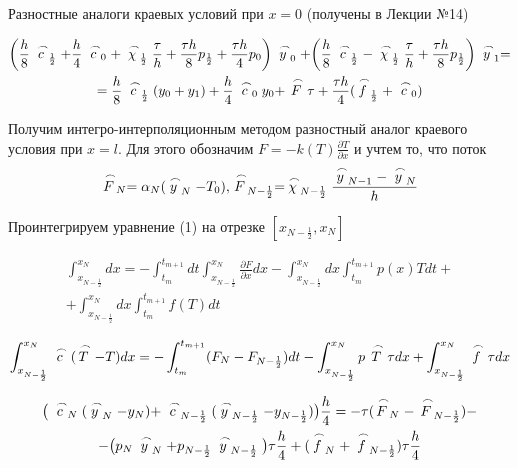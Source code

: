 \documentclass[a4paper, 14pt]{article}
\begin{document}
Разностные аналоги краевых условий при $x = 0$ (получены в Лекции №14)

\begin{multline}
\bigg(\frac{h}{8}\buildrel\,\,\frown\over{c}_{\frac{1}{2}}+ \frac{h}{4}\buildrel\,\,\frown\over{c}_0+\buildrel\,\,\frown\over{\chi}_{\frac{1}{2}}\frac{\tau}{h}+\frac{\tau h}{8}p_{\frac{1}{2}}+\frac{\tau h}{4}p_0\bigg)\buildrel\,\,\frown\over{y}_0+\bigg(\frac{h}{8}\buildrel\,\,\frown\over{c}_{\frac{1}{2}}-\buildrel\,\,\frown\over{\chi}_{\frac{1}{2}}\frac{\tau}{h}+\frac{\tau h}{8}p_{\frac{1}{2}}\bigg)\buildrel\,\,\frown\over{y}_1=\\
= \frac{h}{8}\buildrel\,\,\frown\over{c}_{\frac{1}{2}}(y_0+y_1)+\frac{h}{4}\buildrel\,\,\frown\over{c}_0y_0+\buildrel\,\,\frown\over{F}\tau+\frac{\tau h}{4}(\buildrel\,\,\frown\over{f}_{\frac{1}{2}}+\buildrel\,\,\frown\over{c}_0)
\end{multline}

Получим интегро-интерполяционным методом разностный аналог краевого условия при  $x = l$. Для этого обозначим $F=-k(T)\frac{\partial T}{\partial x}$ и учтем то, что поток
$$
\buildrel\,\,\frown\over{F}_N=\alpha_N(\buildrel\,\,\frown\over{y}_N-T_0),
\buildrel\,\,\frown\over{F}_{N-\frac{1}{2}}=\buildrel\,\,\frown\over{\chi}_{N-\frac{1}{2}}\frac{\buildrel\,\,\frown\over{y}_{N-1}-\buildrel\,\,\frown\over{y}_N}{h}
$$

Проинтегрируем уравнение (1) на отрезке $[x_{N-\frac{1}{2}},x_N]$

\begin{multline*}
\int^{x_N}_{x_{N-{\frac{1}{2}}}}dx=-\int^{t_{m+1}}_{t_{m}}dt\int^{x_N}_{x_{N-{\frac{1}{2}}}}\frac{\partial F}{\partial x}dx-\int^{x_N}_{x_{N-{\frac{1}{2}}}}dx\int^{t_{m+1}}_{t_{m}}p(x)Tdt+\\
+\int^{x_N}_{x_{N-{\frac{1}{2}}}}dx\int^{t_{m+1}}_{t_{m}}f(T)dt
\end{multline*}

\begin{multline*}
\int^{x_N}_{x_{N-{\frac{1}{2}}}}\buildrel\,\,\frown\over{c}(\buildrel\,\,\frown\over{T}-T)dx = 
-\int^{t_{m+1}}_{t_{m}}(F_N-F_{N-\frac{1}{2}})dt-\int^{x_N}_{x_{N-{\frac{1}{2}}}}p\buildrel\,\,\frown\over{T}\tau dx+\int^{x_N}_{x_{N-{\frac{1}{2}}}}\buildrel\,\,\frown\over{f}\tau dx
\end{multline*}

\begin{multline*}
\big(\buildrel\,\,\frown\over{c}_{N}(\buildrel\,\,\frown\over{y}_N-y_N) + 
\buildrel\,\,\frown\over{c}_{N-\frac{1}{2}}(\buildrel\,\,\frown\over{y}_{N-\frac{1}{2}} -
y_{N-\frac{1}{2}})\big)\frac{h}{4} = 
-\tau(\buildrel\,\,\frown\over{F}_N - 
\buildrel\,\,\frown\over{F}_{N-\frac{1}{2}})-\\
-\big(p_N\buildrel\,\,\frown\over{y}_N +
p_{N-\frac{1}{2}}\buildrel\,\,\frown\over{y}_{N -
\frac{1}{2}}\big)\tau\frac{h}{4} +
(\buildrel\,\,\frown\over{f}_N +
\buildrel\,\,\frown\over{f}_{N-\frac{1}{2}})\tau \frac{h}{4}
\end{multline*}
\end{document}
